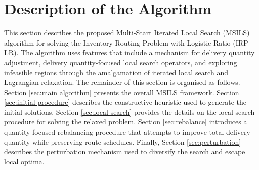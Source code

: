 \documentclass{article}
\begin{document}

\section{Description of the Algorithm}\label{sec: alg}


This section describes the proposed Multi-Start Iterated Local Search (\hyperref[alg:MSILS]{MSILS}) algorithm for solving the Inventory Routing Problem with Logistic Ratio (IRP-LR). The algorithm uses features that include a mechanism for delivery quantity adjustment, delivery quantity-focused local search operators, and exploring infeasible regions through the amalgamation of iterated local search and Lagrangian relaxation. The remainder of this section is organised as follows. Section \ref{sec:main algorithm} presents the overall \hyperref[alg:MSILS]{MSILS} framework. Section \ref{sec:initial procedure} describes the constructive heuristic used to generate the initial solutions. Section \ref{sec:local search} provides the details on the local search procedure for solving the relaxed problem. Section \ref{sec:rebalance} introduces a quantity-focused rebalancing procedure that attempts to improve total delivery quantity while preserving route schedules. Finally, Section \ref{sec:perturbation} describes the perturbation mechanism used to diversify the search and escape local optima.
\end{document}
